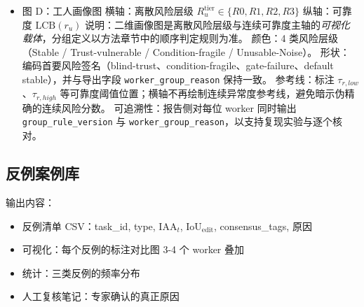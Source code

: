 \begin{itemize}
\\ 局部失效操作定义：预注册，满足以下任一条件即标记为 $failure_{u,s}=1$：
\begin{enumerate}
    \item 绝对阈值：$r_{u}^{(s)}<0.70$；
    \item 相对下降：$r_{u}^{(s)}<r_{u}-0.10$；
    \item 保守显著性：$r_{u}^{(s)}$ 的 95\% CI 上界 $<$ $r_{u}$ 的 95\% CI 下界。
\end{enumerate}

    \item 图 D：工人画像图
横轴：离散风险层级 $R_u^{\mathrm{tier}}\in\{R0,R1,R2,R3\}$
纵轴：可靠度 $\mathrm{LCB}(r_u)$
    \newline 说明：二维画像图是离散风险层级与连续可靠度主轴的\emph{可视化载体}，分组定义以方法章节中的顺序判定规则为准。
    \newline 颜色：4 类风险层级（Stable / Trust-vulnerable / Condition-fragile / Unusable-Noise）。
    \newline 形状：编码首要风险签名（blind-trust、condition-fragile、gate-failure、default stable），并与导出字段 \texttt{worker\_group\_reason} 保持一致。
    \newline 参考线：标注 $\tau_{r,low}$、$\tau_{r,high}$ 等可靠度阈值位置；横轴不再绘制连续异常度参考线，避免暗示伪精确的连续风险分数。
    \newline 可追溯性：报告侧对每位 worker 同时输出 \texttt{group\_rule\_version} 与 \texttt{worker\_group\_reason}，以支持复现实验与逐个核对。
\end{itemize}


\subsection{反例案例库}
输出内容：
\begin{itemize}
    \item 反例清单 CSV：task\_id, type, $\mathrm{IAA}_{t}$, $\mathrm{IoU}_{\mathrm{edit}}$, consensus\_tags, 原因
    \item  可视化：每个反例的标注对比图 3-4 个 worker 叠加
    \item 统计：三类反例的频率分布
    \item 人工复核笔记：专家确认的真正原因

\end{itemize}

